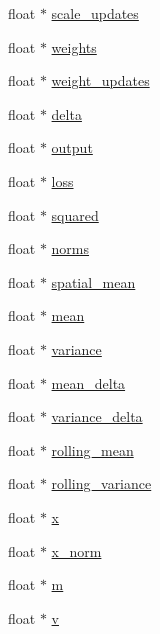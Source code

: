 \begin{DoxyCompactItemize}
\item 
float $\ast$ \mbox{\hyperlink{structlayer_afe8abd57f459714570b99b521cf9e159}{scale\+\_\+updates}}
\item 
float $\ast$ \mbox{\hyperlink{structlayer_a552e6eca39a5d0dc6fa12901502c7e78}{weights}}
\item 
float $\ast$ \mbox{\hyperlink{structlayer_a24eda1775cf0b0e188446089a25780b7}{weight\+\_\+updates}}
\item 
float $\ast$ \mbox{\hyperlink{structlayer_a1360cf3c28df067cc6f3af139fa95d3a}{delta}}
\item 
float $\ast$ \mbox{\hyperlink{structlayer_a04d23c71428242b3153eda588f844eb3}{output}}
\item 
float $\ast$ \mbox{\hyperlink{structlayer_a6554389eac1170d557224124d81eb3d6}{loss}}
\item 
float $\ast$ \mbox{\hyperlink{structlayer_ae8ed52c73d5fc1d13d2fbf0b920dda7e}{squared}}
\item 
float $\ast$ \mbox{\hyperlink{structlayer_acb730788dd9a0c77c7e501b9118a2933}{norms}}
\item 
float $\ast$ \mbox{\hyperlink{structlayer_ac3167d1999c93f60856076a4da9c3fc3}{spatial\+\_\+mean}}
\item 
float $\ast$ \mbox{\hyperlink{structlayer_a57e3ce10060c51c846086d20944f2448}{mean}}
\item 
float $\ast$ \mbox{\hyperlink{structlayer_a4307e89c5c91bef35a9b54e4662e247d}{variance}}
\item 
float $\ast$ \mbox{\hyperlink{structlayer_a6ae807c0129ad454f9a850e2e5c20544}{mean\+\_\+delta}}
\item 
float $\ast$ \mbox{\hyperlink{structlayer_a6ac77051b9f79c2a72732b7b7f3f536c}{variance\+\_\+delta}}
\item 
float $\ast$ \mbox{\hyperlink{structlayer_aadc24d03a6dbab21fcafad3d29bb1310}{rolling\+\_\+mean}}
\item 
float $\ast$ \mbox{\hyperlink{structlayer_a316830907cb724b9304cea311c8d8dc5}{rolling\+\_\+variance}}
\item 
float $\ast$ \mbox{\hyperlink{structlayer_a78b279684acc59b1b891f63225e5715e}{x}}
\item 
float $\ast$ \mbox{\hyperlink{structlayer_a080a015b7c11489ecca087ece911a6b6}{x\+\_\+norm}}
\item 
float $\ast$ \mbox{\hyperlink{structlayer_acfd875ae4a4c774d30e04e03a24085f9}{m}}
\item 
float $\ast$ \mbox{\hyperlink{structlayer_a9493ddf18d4f6d9234a703d2575697db}{v}}
\item 

\end{DoxyCompactItemize}
